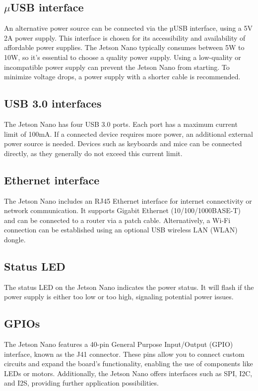 \subsection{$\mu$USB interface}

An alternative power source can be connected via the µUSB interface, using a 5V 2A power supply. This interface is chosen for its accessibility and availability of affordable power supplies. The Jetson Nano typically consumes between 5W to 10W, so it’s essential to choose a quality power supply. Using a low-quality or incompatible power supply can prevent the Jetson Nano from starting. To minimize voltage drops, a power supply with a shorter cable is recommended.


\subsection{USB 3.0 interfaces}

The Jetson Nano has four USB 3.0 ports. Each port has a maximum current limit of 100mA. If a connected device requires more power, an additional external power source is needed. Devices such as keyboards and mice can be connected directly, as they generally do not exceed this current limit.


\subsection{Ethernet interface}

The Jetson Nano includes an RJ45 Ethernet interface for internet connectivity or network communication. It supports Gigabit Ethernet (10/100/1000BASE-T) and can be connected to a router via a patch cable. Alternatively, a Wi-Fi connection can be established using an optional USB wireless LAN (WLAN) dongle.


\subsection{Status LED}

The status LED on the Jetson Nano indicates the power status. It will flash if the power supply is either too low or too high, signaling potential power issues.


\subsection{GPIOs}

The Jetson Nano features a 40-pin General Purpose Input/Output (GPIO) interface, known as the J41 connector. These pins allow you to connect custom circuits and expand the board’s functionality, enabling the use of components like LEDs or motors. Additionally, the Jetson Nano offers interfaces such as SPI, I2C, and I2S, providing further application possibilities.


